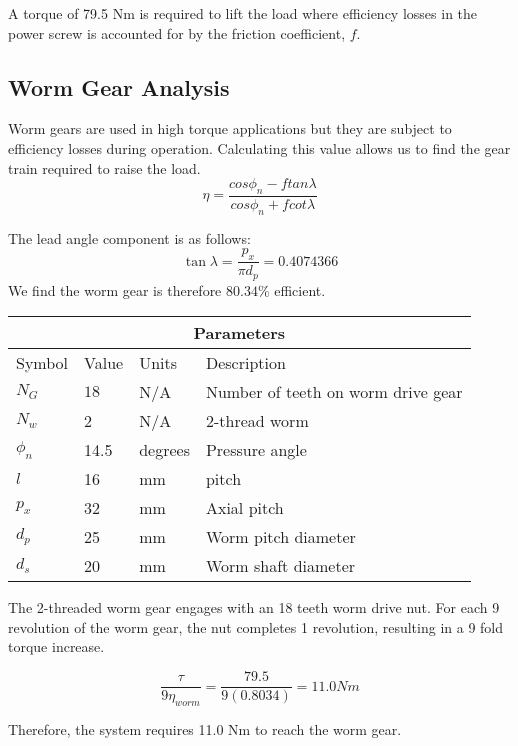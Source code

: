 \documentclass[letterpaper,12pt]{article}
\begin{document}
A torque of 79.5 Nm is required to lift the load where efficiency losses in the power screw is accounted for by the friction coefficient, $f$. 
    
\subsection{Worm Gear Analysis}
Worm gears are used in high torque applications but they are subject to efficiency losses during operation. Calculating this value allows us to find the gear train required to raise the load. \\

	\begin{equation}
	\eta = \frac{cos\phi_n - ftan\lambda}{cos\phi_n+fcot\lambda}
	\end{equation}
	
The lead angle component is as follows:
	\begin{equation}
\tan \lambda =  \frac{p_x}{\pi d_p} = 0.4074366
	\end{equation}
We find the worm gear is therefore $80.34 \% $ efficient.
\begin{center}
		\begin{tabular}{ |p{2cm}||p{3cm}|p{2cm}|p{7cm}|  }
			\hline
			\multicolumn{4}{|c|}{Parameters} \\
			\hline
			Symbol& Value & Units & Description\\
			\hline
			$N_G$ & $18$ & N/A & Number of teeth on worm drive gear\\
			$N_w$ & 2 & N/A   & 2-thread worm \\
			$\phi_n$ & 14.5 & degrees &  Pressure angle\\
			$l$ & 16 & mm & pitch\\
			$p_x$ & 32 & mm & Axial pitch\\
			$d_p$ & 25 & mm & Worm pitch diameter\\
			$d_s$ & 20 & mm & Worm shaft diameter\\
			\hline
		\end{tabular}
	\end{center}

The 2-threaded worm gear engages with an 18 teeth worm drive nut. For each 9 revolution of the worm gear, the nut completes 1 revolution, resulting in a 9 fold torque increase. 

$$\frac{\tau }{9 \eta_{worm}} = \frac{79.5}{9(0.8034)} = 11.0 Nm$$

Therefore, the system requires 11.0 Nm to reach the worm gear. 
\end{document}
